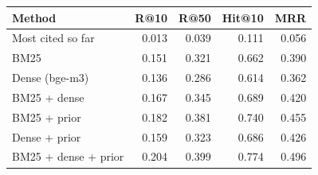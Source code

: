 \begin{tabular}{lrrrr}
\toprule
Method & R@10 & R@50 & Hit@10 & MRR \\
\midrule
Most cited so far & 0.013 & 0.039 & 0.111 & 0.056 \\
BM25 & 0.151 & 0.321 & 0.662 & 0.390 \\
Dense (bge-m3) & 0.136 & 0.286 & 0.614 & 0.362 \\
BM25 + dense & 0.167 & 0.345 & 0.689 & 0.420 \\
BM25 + prior & 0.182 & 0.381 & 0.740 & 0.455 \\
Dense + prior & 0.159 & 0.323 & 0.686 & 0.426 \\
BM25 + dense + prior & 0.204 & 0.399 & 0.774 & 0.496 \\
\bottomrule
\end{tabular}
